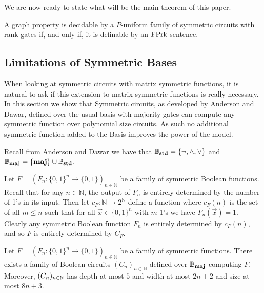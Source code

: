 \documentclass[../paper.tex]{subfiles}
\begin{document}


We are now ready to state what will be the main theorem of this paper.
\begin{thm}
  A graph property is decidable by a $P$-uniform family of symmetric circuits
  with rank gates if, and only if, it is definable by an $\text{\upshape FPrk}$ sentence.
\end{thm}

\subsection{Limitations of Symmetric Bases}
When looking at symmetric circuits with matrix symmetric functions, it is
natural to ask if this extension to matrix-symmetric functions is really
necessary. In this section we show that Symmetric circuits, as developed by
Anderson and Dawar, defined over the usual basis with majority gates can compute
any symmetric function over polynomial size circuits. As such no additional
symmetric function added to the Basis improves the power of the model.

Recall from Anderson and Dawar \cite{AndersonD17} we have that
$\mathbb{B}_{\text{\textbf{std}}} = \{ \neg , \wedge , \lor \}$ and $\mathbb{B}_{\text{\textbf{maj}}} = \{ \text{\textbf{maj}}
\} \cup \mathbb{B}_{\text{\textbf{std}}}$.

Let $F = (F_n: \{0,1\}^n \rightarrow \{0,1\})_{n \in \mathbb{N}}$ be a family of
symmetric Boolean functions. Recall that for any $n \in \mathbb{N}$, the output
of $F_n$ is entirely determined by the number of 1's in its input. Then let
$c_{F}:\mathbb{N} \rightarrow 2^{\mathbb{N}}$ define a function where $c_{F}(n)$
is the set of all $m \leq n$ such that for all $\vec{x} \in \{ 0,1 \}^n$ with
$m$ 1's we have $F_n (\vec{x}) = 1$. Clearly any symmetric Boolean function
$F_n$ is entirely determined by $c_{F}(n)$, and so $F$ is entirely determined by
$C_F$.
 
\begin{prop}
  \label{prop:fuctions-maj}
  Let $F = (F_n: \{0,1\}^n \rightarrow \{0,1\})_{n \in \mathbb{N}}$ be a family
  of symmetric functions. There exists a family of Boolean circuits $(C_n)_{n
    \in \mathbb{N}}$ defined over $\mathbb{B}_{\text{\textbf{maj}}}$ computing $F$. Moreover,
  $(C_n)_{n \in \mathbb{N}}$ has depth at most $5$ and width at most $2n+2$ and size
  at most $8n + 3$.
\end{prop}
\end{document}
